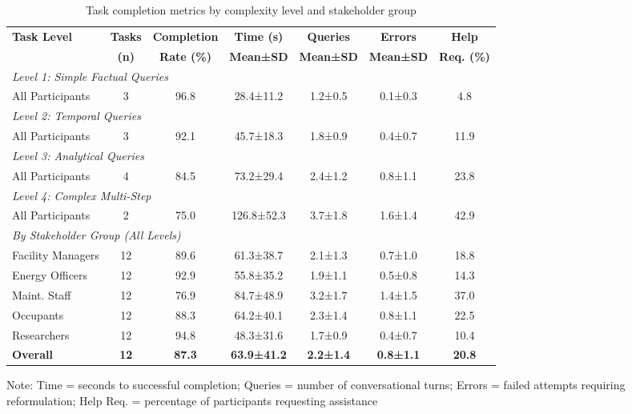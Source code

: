 \documentclass[acmlarge]{acmart}
\begin{document}
\begin{table}[h]
\centering
\begin{threeparttable}
\caption{Task completion metrics by complexity level and stakeholder group}
\label{tab:task-performance}
\scriptsize
\begin{tabular}{@{}lcccccc@{}}
\toprule
\textbf{Task Level} & \textbf{Tasks} & \textbf{Completion} & \textbf{Time (s)} & \textbf{Queries} & \textbf{Errors} & \textbf{Help} \\
 & \textbf{(n)} & \textbf{Rate (\%)} & \textbf{Mean±SD} & \textbf{Mean±SD} & \textbf{Mean±SD} & \textbf{Req. (\%)} \\
\midrule
\multicolumn{7}{l}{\textit{Level 1: Simple Factual Queries}} \\
All Participants & 3 & 96.8 & 28.4±11.2 & 1.2±0.5 & 0.1±0.3 & 4.8 \\
\multicolumn{7}{l}{\textit{Level 2: Temporal Queries}} \\
All Participants & 3 & 92.1 & 45.7±18.3 & 1.8±0.9 & 0.4±0.7 & 11.9 \\
\multicolumn{7}{l}{\textit{Level 3: Analytical Queries}} \\
All Participants & 4 & 84.5 & 73.2±29.4 & 2.4±1.2 & 0.8±1.1 & 23.8 \\
\multicolumn{7}{l}{\textit{Level 4: Complex Multi-Step}} \\
All Participants & 2 & 75.0 & 126.8±52.3 & 3.7±1.8 & 1.6±1.4 & 42.9 \\
\midrule
\multicolumn{7}{l}{\textit{By Stakeholder Group (All Levels)}} \\
Facility Managers & 12 & 89.6 & 61.3±38.7 & 2.1±1.3 & 0.7±1.0 & 18.8 \\
Energy Officers & 12 & 92.9 & 55.8±35.2 & 1.9±1.1 & 0.5±0.8 & 14.3 \\
Maint. Staff & 12 & 76.9 & 84.7±48.9 & 3.2±1.7 & 1.4±1.5 & 37.0 \\
Occupants & 12 & 88.3 & 64.2±40.1 & 2.3±1.4 & 0.8±1.1 & 22.5 \\
Researchers & 12 & 94.8 & 48.3±31.6 & 1.7±0.9 & 0.4±0.7 & 10.4 \\
\midrule
\textbf{Overall} & \textbf{12} & \textbf{87.3} & \textbf{63.9±41.2} & \textbf{2.2±1.4} & \textbf{0.8±1.1} & \textbf{20.8} \\
\bottomrule
\end{tabular}
\begin{tablenotes}
\small
\item Note: Time = seconds to successful completion; Queries = number of conversational turns; Errors = failed attempts requiring reformulation; Help Req. = percentage of participants requesting assistance
\end{tablenotes}
\end{threeparttable}
\end{table}
\end{document}
